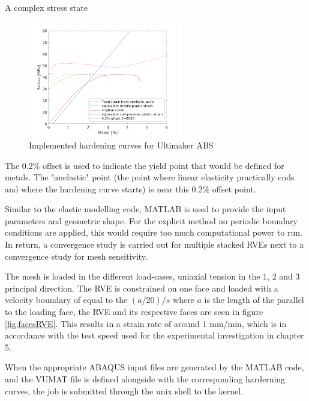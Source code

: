 A complex stress state 

\begin{figure}[H]
    \centering
    \includegraphics[width=0.60\textwidth]{chapter_7_non-elasticmodelling/figures/Hardening.png}
    \caption{Implemented hardening curves for Ultimaker ABS}
    \label{fig:hardening}
\end{figure}

The 0.2\% offset is used to indicate the yield point that would be defined for metals. The "anelastic" point (the point where linear elasticity practically ends and  where the hardening curve starts) is near this 0.2\% offset point. 

Similar to the elastic modelling code, MATLAB is used to provide the input parameters and geometric shape. For the explicit method no periodic boundary conditions are applied, this would require too much computational power to run. In return, a convergence study is carried out for multiple stacked RVEs next to a convergence study for mesh sensitivity. 

The mesh is loaded in the different load-cases, uniaxial tension in the 1, 2 and 3 principal direction. The RVE is constrained on one face and loaded with a velocity boundary of equal to the $(a/20)/s$ where $a$ is the length of the parallel to the loading face, the RVE and its respective faces are seen in figure \ref{fig:facesRVE}. This results in a strain rate of around 1 mm/min, which is in accordance with the test speed used for the experimental investigation in chapter 5.

When the appropriate ABAQUS input files are generated by the MATLAB code, and the VUMAT file is defined alongside with the corresponding harderning curves, the job is submitted through the unix shell to the kernel.

